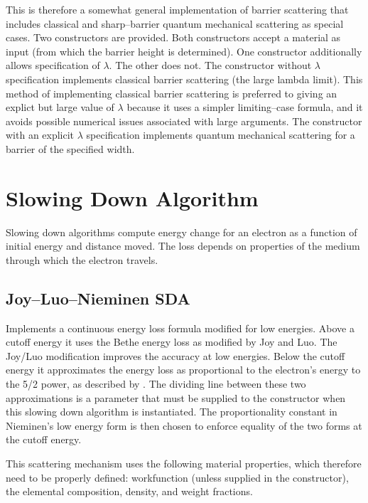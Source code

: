 This is therefore a somewhat general implementation of barrier scattering that includes classical and sharp--barrier quantum mechanical scattering as special cases. Two constructors are provided. Both constructors accept a material as input (from which the barrier height is determined). One constructor additionally allows specification of $\lambda$. The other does not. The constructor without $\lambda$ specification implements classical barrier scattering (the large lambda limit). This method of implementing classical barrier scattering is preferred to giving an explict but large value of $\lambda$ because it uses a simpler limiting--case formula, and it avoids possible numerical issues associated with large arguments. The constructor with an explicit $\lambda$ specification implements quantum mechanical scattering for a barrier of the specified width.

\section{Slowing Down Algorithm}\label{con:sda}
Slowing down algorithms compute energy change for an electron as a function of initial energy and distance moved. The loss depends on properties of the medium through which the electron travels.
 
\subsection{Joy--Luo--Nieminen SDA}
Implements a continuous energy loss formula modified for low energies. Above a cutoff energy it uses the Bethe energy loss as modified by Joy and Luo. The Joy/Luo modification improves the accuracy at low energies. Below the cutoff energy it approximates the energy loss as proportional to the electron's energy to the 5/2 power, as described by \cite{Nieminen}. The dividing line between these two approximations is a parameter that must be supplied to the constructor when this slowing down algorithm is instantiated. The proportionality constant in Nieminen's low energy form is then chosen to enforce equality of the two forms at the cutoff energy.

This scattering mechanism uses the following material properties, which therefore need to be properly defined: workfunction (unless supplied in the constructor), the elemental composition, density, and weight fractions.